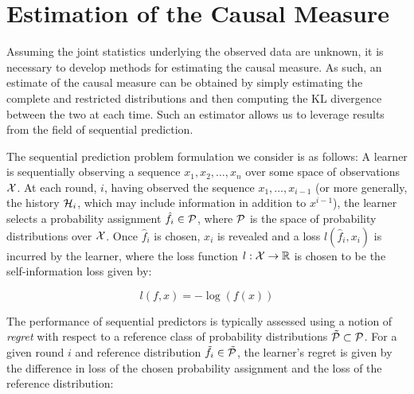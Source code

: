 \section{Estimation of the Causal Measure}

\begin{comment}
- Sequential Prediction
- Notion of causality regret - whereas DI has one value that the Tsachy paper tries to converge to, we are looking more at a sequential prediction problem because we want to estimate causality accurately at every point in time
- Theorem
- Independent selection of restricted and complete reference classes - addresses problem with restricted distribution being infinite order raised in Purdon paper
- Discussion of estimating with time varying statistics
- Can be computed online
\end{comment}

Assuming the joint statistics underlying the observed data are unknown, it is necessary to develop methods for estimating the causal measure. As such, an estimate of the causal measure can be obtained by simply estimating the complete and restricted distributions and then computing the KL divergence between the two at each time. Such an estimator allows us to leverage results from the field of sequential prediction.

The sequential prediction problem formulation we consider is as follows: A learner is sequentially observing a sequence $x_1,x_2,\dots,x_n$ over some space of observations $\mathcal{X}$. At each round, $i$, having observed the sequence $x_1,\dots,x_{i-1}$ (or more generally, the history $\mathcal{H}_i$, which may include information in addition to $x^{i-1}$), the learner selects a probability assignment $\hat{f}_i \in \mathcal{P}$, where $\mathcal{P}$ is the space of probability distributions over $\mathcal{X}$. Once $\hat{f}_i$ is chosen, $x_i$ is revealed and a loss $l(\hat{f}_i,x_i)$ is incurred by the learner, where the loss function $l:\mathcal{X}\rightarrow \mathbb{R}$ is chosen to be the self-information loss given by:

\begin{equation}
l(f,x) = -\log(f(x))
\end{equation}

The performance of sequential predictors is typically assessed using a notion of \emph{regret} with respect to a reference class of probability distributions $\tilde{\mathcal{P}} \subset \mathcal{P}$. For a given round $i$ and reference distribution $\tilde{f}_i \in \tilde{\mathcal{P}}$, the learner's regret is given by the difference in loss of the chosen probability assignment and the loss of the reference distribution:

